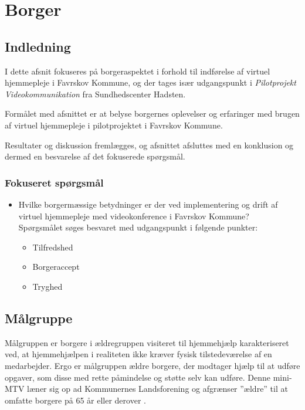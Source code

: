 \chapter{Borger}

\section{Indledning}
I dette afsnit fokuseres på borgeraspektet i forhold til indførelse af virtuel hjemmepleje i Favrskov Kommune, og der tages især udgangspunkt i \textit{Pilotprojekt Videokommunikation} fra Sundhedscenter Hadsten. 

Formålet med afsnittet er at belyse borgernes oplevelser og erfaringer med brugen af virtuel hjemmepleje i pilotprojektet i Favrskov Kommune. 

Resultater og diskussion fremlægges, og afsnittet afsluttes med en konklusion og dermed en besvarelse af det fokuserede spørgsmål.



\subsection{Fokuseret spørgsmål}
\begin{itemize}
	\item Hvilke borgermæssige betydninger er der ved implementering og drift af virtuel hjemmepleje med videokonference i Favrskov Kommune? \\Spørgsmålet søges besvaret med udgangspunkt i følgende punkter:
	\begin{itemize}
	\item Tilfredshed
	\item Borgeraccept
	\item Tryghed
\end{itemize}
\end{itemize}

\section{Målgruppe}
Målgruppen er borgere i ældregruppen visiteret til hjemmehjælp karakteriseret ved, at hjemmehjælpen i realiteten ikke kræver fysisk tilstedeværelse af en medarbejder. Ergo er målgruppen ældre borgere, der modtager hjælp til at udføre opgaver, som disse med rette påmindelse og støtte selv kan udføre. Denne mini-MTV læner sig op ad Kommunernes Landsforening og afgrænser ”ældre” til at omfatte borgere på 65 år eller derover \cite{KL}. 


